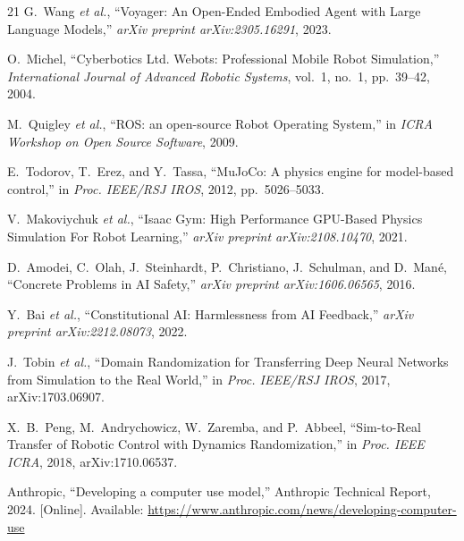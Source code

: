 \documentclass[conference]{IEEEtran}
\begin{document}
\begin{thebibliography}{21}
G.~Wang \emph{et al.}, ``Voyager: An Open-Ended Embodied Agent with Large Language Models,'' \emph{arXiv preprint arXiv:2305.16291}, 2023.

O.~Michel, ``Cyberbotics Ltd. Webots\texttrademark: Professional Mobile Robot Simulation,'' \emph{International Journal of Advanced Robotic Systems}, vol.~1, no.~1, pp.~39--42, 2004.

M.~Quigley \emph{et al.}, ``ROS: an open-source Robot Operating System,'' in \emph{ICRA Workshop on Open Source Software}, 2009.

E.~Todorov, T.~Erez, and Y.~Tassa, ``MuJoCo: A physics engine for model-based control,'' in \emph{Proc. IEEE/RSJ IROS}, 2012, pp.~5026--5033.

V.~Makoviychuk \emph{et al.}, ``Isaac Gym: High Performance GPU-Based Physics Simulation For Robot Learning,'' \emph{arXiv preprint arXiv:2108.10470}, 2021.

D.~Amodei, C.~Olah, J.~Steinhardt, P.~Christiano, J.~Schulman, and D.~Man\'e, ``Concrete Problems in AI Safety,'' \emph{arXiv preprint arXiv:1606.06565}, 2016.

Y.~Bai \emph{et al.}, ``Constitutional AI: Harmlessness from AI Feedback,'' \emph{arXiv preprint arXiv:2212.08073}, 2022.

J.~Tobin \emph{et al.}, ``Domain Randomization for Transferring Deep Neural Networks from Simulation to the Real World,'' in \emph{Proc. IEEE/RSJ IROS}, 2017, arXiv:1703.06907.

X.~B.~Peng, M.~Andrychowicz, W.~Zaremba, and P.~Abbeel, ``Sim-to-Real Transfer of Robotic Control with Dynamics Randomization,'' in \emph{Proc. IEEE ICRA}, 2018, arXiv:1710.06537.

Anthropic, ``Developing a computer use model,'' Anthropic Technical Report, 2024. [Online]. Available: \url{https://www.anthropic.com/news/developing-computer-use}

\end{thebibliography}
\end{document}
